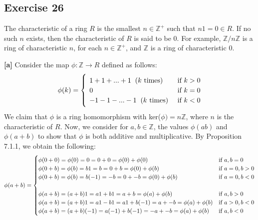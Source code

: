 \subsection*{Exercise 26}
The characteristic of a ring $R$ is the smallest $n \in \mathbb{Z}^+$ such that $n1 = 0 \in R$. If no such $n$ exists, then the characteristic of $R$ is said to be 0. For example, $\mathbb{Z}/n\mathbb{Z}$ is a ring of characteristic $n$, for each $n \in \mathbb{Z}^+$, and $\mathbb{Z}$ is a ring of characteristic 0.

\vspace{3 mm}

\textbf{[a]} Consider the map $\phi: \mathbb{Z} \rightarrow R$ defined as follows:
\[
\phi(k) =
\begin{cases}
    \hspace{1.5 mm} 1 + 1 + ... + 1 \hspace{2 mm} ( k \textnormal{ times} ) & \textnormal{ if } k > 0 \\
    \hspace{1.5 mm} 0 & \textnormal{ if } k = 0 \\
    \hspace{1.5 mm} -1 - 1 - ... - 1 \hspace{2 mm} ( k \textnormal{ times} ) & \textnormal{ if } k < 0
\end{cases}
\]
We claim that $\phi$ is a ring homomorphism with ker($\phi) = n\mathbb{Z}$, where $n$ is the characteristic of $R$. Now, we consider for $a,b \in \mathbb{Z}$, the values $\phi(ab)$ and $\phi(a+b)$ to show that $\phi$ is both additive and multiplicative. By Proposition 7.1.1, we obtain the following:
\[
\phi(a+b) =
\begin{cases}
    \phi(0 + 0) = \phi(0) = 0 = 0 + 0 = \phi(0) + \phi(0) & \textnormal{if } a,b = 0 \\
    \phi(0 + b) = \phi(b) = b1 = b = 0 + b = \phi(0) + \phi(b) & \textnormal{if } a = 0, b > 0 \\
    \phi(0 + b) = \phi(b) = b(-1) = -b = 0 + -b = \phi(0) + \phi(b) & \textnormal{if } a = 0, b < 0 \\
    \\
    \phi(a + b) = (a + b)1 = a1 + b1 = a + b = \phi(a) + \phi(b) & \textnormal{if } a,b > 0 \\
    \phi(a + b) = (a + b)1 = a1 - b1 = a1 + b(-1) = a + -b = \phi(a) + \phi(b) & \textnormal{if } a > 0, b < 0 \\
    \phi(a + b) = (a + b)(-1) = a(-1) + b(-1) = -a + -b = \phi(a) + \phi(b) & \textnormal{if } a,b  < 0
\end{cases}
\]
